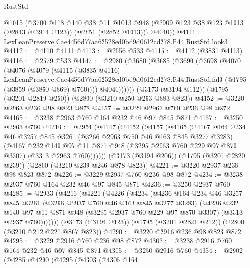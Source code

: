 \begin{lexlean}{RustStd}
\begin{coremodule}
      @1015
      (@3700
        @178
        @140
        @38
        @11
        @1013
        @948
        (@3909 @123 @38 @123 @1013 (@2843 (@3914 @123)) (@2851 (@2852 @1013)))
        @4040))
@4111 := LexLeanPreserve.Cae4456d77aa62528ed0bd9d0612cd278.R44.RustStd.look3
@4112 := @4110 @4111
@4113 := @2556 @533
@4115 := @4112 (@3831 @4113)
@4116 := @2579 @533
@4147 := @2980
    (@3680
      (@3685
        (@3690
          (@3698
            (@4070
              (@4076
                (@4079
                  (@4115
                    (@3835 @4116)
                    LexLeanPreserve.Cae4456d77aa62528ed0bd9d0612cd278.R44.RustStd.fal3
                    (@1795 (@3859 (@3860 @869) @760))))
                @4040))))))
    (@3173 (@3194 @112))
    (@1795 (@3201 @2819 @250))
    (@2800 (@3210 @250 @263 @883 @823))
@4152 := @3220 @2963 @236 @98 @823 @872
@4157 := @3229 @2963 @760 @236 @98 @872
@4165 := @3238 @2963 @760 @164 @232 @46 @97 @845 @871
@4167 := @3250 @2963 @760
@4216 := @2954
    (@4147
      (@4152
        (@4157
          (@4165
            (@4167
              @164
              @234
              @46
              @3257
              @845
              @3261
              (@3266 @2963 @760 @46 @163 @845 @3277 @3283)
              (@4167
                @232
                @140
                @97
                @11
                @871
                @948
                (@3295 @2963 @760 @229 @97 @870 @3307)
                (@3313 @2963 @760)))))))
    (@3173 (@3194 @206))
    (@1795 (@3201 @2820 @239))
    (@2800 (@3210 @239 @246 @878 @823))
@4221 := @3220 @2937 @236 @98 @823 @872
@4226 := @3229 @2937 @760 @236 @98 @872
@4234 := @3238 @2937 @760 @164 @232 @46 @97 @845 @871
@4236 := @3250 @2937 @760
@4285 := @2933
    (@4216
      (@4221
        (@4226
          (@4234
            (@4236
              @164
              @234
              @46
              @3257
              @845
              @3261
              (@3266 @2937 @760 @46 @163 @845 @3277 @3283)
              (@4236
                @232
                @140
                @97
                @11
                @871
                @948
                (@3295 @2937 @760 @229 @97 @870 @3307)
                (@3313 @2937 @760)))))))
    (@3173 (@3194 @123))
    (@1795 (@3201 @2821 @212))
    (@2800 (@3210 @212 @227 @867 @823))
@4290 := @3220 @2916 @236 @98 @823 @872
@4295 := @3229 @2916 @760 @236 @98 @872
@4303 := @3238 @2916 @760 @164 @232 @46 @97 @845 @871
@4305 := @3250 @2916 @760
@4354 := @2902
    (@4285
      (@4290
        (@4295
          (@4303
            (@4305
              @164

\end{coremodule}
\end{lexlean}
